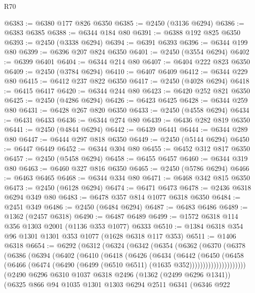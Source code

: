 \begin{lexlean}{R70}
\begin{coremodule}
@6383 := @6380 @177 @826 @6350
@6385 := @2450 (@3136 @6294)
@6386 := @6383 @6385
@6388 := @6344 @184 @80
@6391 := @6388 @192 @825 @6350
@6393 := @2450 (@3338 @6294)
@6394 := @6391 @6393
@6396 := @6344 @199 @80
@6399 := @6396 @207 @824 @6350
@6401 := @2450 (@3554 @6294)
@6402 := @6399 @6401
@6404 := @6344 @214 @80
@6407 := @6404 @222 @823 @6350
@6409 := @2450 (@3784 @6294)
@6410 := @6407 @6409
@6412 := @6344 @229 @80
@6415 := @6412 @237 @822 @6350
@6417 := @2450 (@4028 @6294)
@6418 := @6415 @6417
@6420 := @6344 @244 @80
@6423 := @6420 @252 @821 @6350
@6425 := @2450 (@4286 @6294)
@6426 := @6423 @6425
@6428 := @6344 @259 @80
@6431 := @6428 @267 @820 @6350
@6433 := @2450 (@4558 @6294)
@6434 := @6431 @6433
@6436 := @6344 @274 @80
@6439 := @6436 @282 @819 @6350
@6441 := @2450 (@4844 @6294)
@6442 := @6439 @6441
@6444 := @6344 @289 @80
@6447 := @6444 @297 @818 @6350
@6449 := @2450 (@5144 @6294)
@6450 := @6447 @6449
@6452 := @6344 @304 @80
@6455 := @6452 @312 @817 @6350
@6457 := @2450 (@5458 @6294)
@6458 := @6455 @6457
@6460 := @6344 @319 @80
@6463 := @6460 @327 @816 @6350
@6465 := @2450 (@5786 @6294)
@6466 := @6463 @6465
@6468 := @6344 @334 @80
@6471 := @6468 @342 @815 @6350
@6473 := @2450 (@6128 @6294)
@6474 := @6471 @6473
@6478 := @2436 @6318 @6294 @349 @80
@6483 := @6478 @357 @814 @1077 @6318 @6350
@6484 := @2451 @349
@6486 := @2450 (@6484 @6294)
@6487 := @6483 @6486
@6489 := @1362 (@2457 @6318)
@6490 := @6487 @6489
@6499 := @1572 @6318 @114 @356 @1303 @2001 (@1136 @353 @1077) @6333
@6510 := @1384 @6318 @354 @96 @1301 @1301 @353 @1077 (@1628 @6318 @117 @353)
@6511 := @1406 @6318
@6654 := @6292
    (@6312
      (@6324
        (@6342
          (@6354
            (@6362
              (@6370
                (@6378
                  (@6386
                    (@6394
                      (@6402
                        (@6410
                          (@6418
                            (@6426
                              (@6434
                                (@6442
                                  (@6450
                                    (@6458
                                      (@6466
                                        (@6474
                                          (@6490
                                            (@6499 (@6510 @6511) (@1635 @352)))))))))))))))))))))
      (@2490
        @6296
        @6310
        @1037
        @6318
        @2496
        (@1362 (@2499 @6296 @1341))
        (@6325
          @866
          @94
          @1035
          @1301
          @1303
          @6294
          @2511
          @6341
          (@6346
            @922

\end{coremodule}
\end{lexlean}
